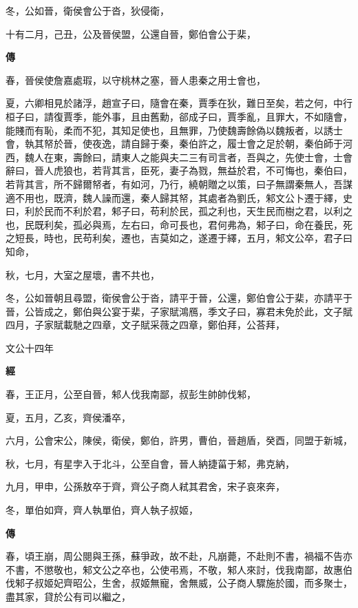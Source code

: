 \documentclass{ctexart}
\begin{document}
冬，公如晉，衛侯會公于沓，狄侵衛，

十有二月，己丑，公及晉侯盟，公還自晉，鄭伯會公于棐，

\textbf{傳}



春，晉侯使詹嘉處瑕，以守桃林之塞，晉人患秦之用士會也，

夏，六卿相見於諸浮，趙宣子曰，隨會在秦，賈季在狄，難日至矣，若之何，中行桓子曰，請復賈季，能外事，且由舊勳，郤成子曰，賈季亂，且罪大，不如隨會，能賤而有恥，柔而不犯，其知足使也，且無罪，乃使魏壽餘偽以魏叛者，以誘士會，執其帑於晉，使夜逸，請自歸于秦，秦伯許之，履士會之足於朝，秦伯師于河西，魏人在東，壽餘曰，請東人之能與夫二三有司言者，吾與之，先使士會，士會辭曰，晉人虎狼也，若背其言，臣死，妻子為戮，無益於君，不可悔也，秦伯曰，若背其言，所不歸爾帑者，有如河，乃行，繞朝贈之以策，曰子無謂秦無人，吾謀適不用也，既濟，魏人譟而還，秦人歸其帑，其處者為劉氏，邾文公卜遷于繹，史曰，利於民而不利於君，邾子曰，苟利於民，孤之利也，天生民而樹之君，以利之也，民既利矣，孤必與焉，左右曰，命可長也，君何弗為，邾子曰，命在養民，死之短長，時也，民苟利矣，遷也，吉莫如之，遂遷于繹，五月，邾文公卒，君子曰知命，

秋，七月，大室之屋壞，書不共也，

冬，公如晉朝且尋盟，衛侯會公于沓，請平于晉，公還，鄭伯會公于棐，亦請平于晉，公皆成之，鄭伯與公宴于棐，子家賦鴻鴈，季文子曰，寡君未免於此，文子賦四月，子家賦載馳之四章，文子賦采薇之四章，鄭伯拜，公荅拜，





文公十四年


\textbf{經}



春，王正月，公至自晉，邾人伐我南鄙，叔彭生帥帥伐邾，

夏，五月，乙亥，齊侯潘卒，

六月，公會宋公，陳侯，衛侯，鄭伯，許男，曹伯，晉趙盾，癸酉，同盟于新城，

秋，七月，有星孛入于北斗，公至自會，晉人納捷菑于邾，弗克納，

九月，甲申，公孫敖卒于齊，齊公子商人弒其君舍，宋子哀來奔，

冬，單伯如齊，齊人執單伯，齊人執子叔姬，

\textbf{傳}



春，頃王崩，周公閱與王孫，蘇爭政，故不赴，凡崩薨，不赴則不書，禍福不告亦不書，不懲敬也，邾文公之卒也，公使弔焉，不敬，邾人來討，伐我南鄙，故惠伯伐邾子叔姬妃齊昭公，生舍，叔姬無寵，舍無威，公子商人驟施於國，而多聚士，盡其家，貸於公有司以繼之，
\end{document}
